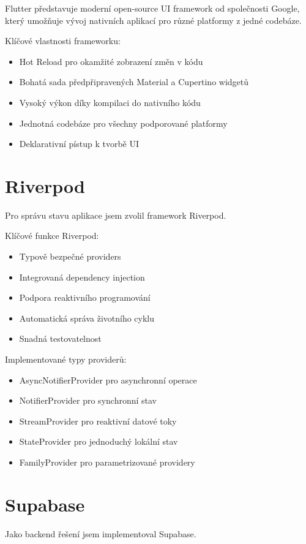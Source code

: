 \documentclass[12pt, a4paper, oneside]{report}
\begin{document}
	Flutter představuje moderní open-source UI framework od společnosti Google, který umožňuje vývoj nativních aplikací pro různé platformy z jedné codebáze.

	Klíčové vlastnosti frameworku:
	\begin{itemize}
		\item Hot Reload pro okamžité zobrazení změn v kódu
		\item Bohatá sada předpřipravených Material a Cupertino widgetů
		\item Vysoký výkon díky kompilaci do nativního kódu
		\item Jednotná codebáze pro všechny podporované platformy
		\item Deklarativní pístup k tvorbě UI
	\end{itemize}

	\section{Riverpod}
	Pro správu stavu aplikace jsem zvolil framework Riverpod.

	Klíčové funkce Riverpod:
	\begin{itemize}
		\item Typově bezpečné providers
		\item Integrovaná dependency injection
		\item Podpora reaktivního programování
		\item Automatická správa životního cyklu
		\item Snadná testovatelnost
	\end{itemize}

	Implementované typy providerů:
	\begin{itemize}
		\item AsyncNotifierProvider pro asynchronní operace
		\item NotifierProvider pro synchronní stav
		\item StreamProvider pro reaktivní datové toky
		\item StateProvider pro jednoduchý lokální stav
		\item FamilyProvider pro parametrizované providery
	\end{itemize}

	\section{Supabase}
	Jako backend řešení jsem implementoval Supabase.
\end{document}
